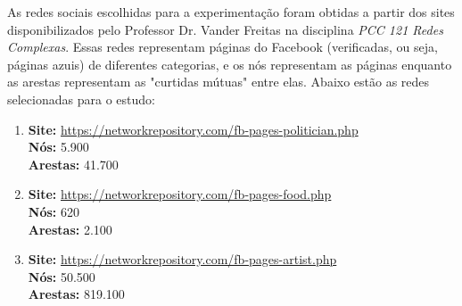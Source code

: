 \documentclass[12pt]{article}
\begin{document}
As redes sociais escolhidas para a experimentação foram obtidas a partir dos sites disponibilizados pelo Professor Dr. Vander Freitas na disciplina \textit{PCC 121 Redes Complexas}. Essas redes representam páginas do Facebook (verificadas, ou seja, páginas azuis) de diferentes categorias, e os nós representam as páginas enquanto as arestas representam as "curtidas mútuas" entre elas. Abaixo estão as redes selecionadas para o estudo:

\begin{enumerate}
    \item \textbf{Site:} \url{https://networkrepository.com/fb-pages-politician.php} \\
    \textbf{Nós:} 5.900 \\
    \textbf{Arestas:} 41.700
    
    \item \textbf{Site:} \url{https://networkrepository.com/fb-pages-food.php} \\
    \textbf{Nós:} 620 \\
    \textbf{Arestas:} 2.100
    
    \item \textbf{Site:} \url{https://networkrepository.com/fb-pages-artist.php} \\
    \textbf{Nós:} 50.500 \\
    \textbf{Arestas:} 819.100
\end{enumerate}



    
\end{document}
